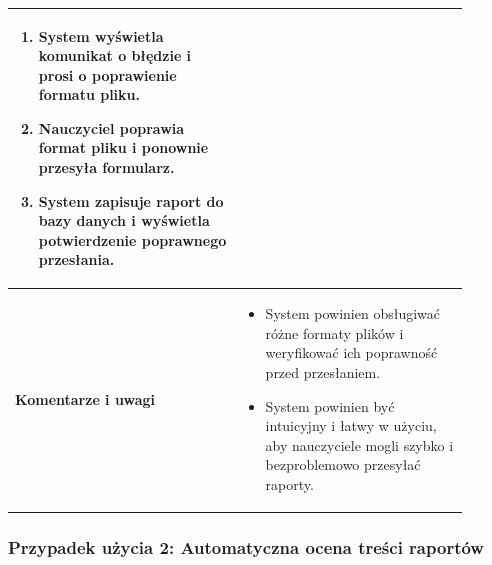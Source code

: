 \documentclass[a4paper, 12pt]{article}
\begin{document}
\begin{table}[H]
\begin{tabular}{|p{0.45\linewidth}|p{0.45\linewidth}|}
\begin{enumerate}
    \item System wyświetla komunikat o błędzie i prosi o poprawienie formatu pliku.
    \item Nauczyciel poprawia format pliku i ponownie przesyła formularz.
    \item System zapisuje raport do bazy danych i wyświetla potwierdzenie poprawnego przesłania.
\end{enumerate} \\
\hline
\textbf{Komentarze i uwagi} &
\begin{itemize}
    \item System powinien obsługiwać różne formaty plików i weryfikować ich poprawność przed przesłaniem.
    \item System powinien być intuicyjny i łatwy w użyciu, aby nauczyciele mogli szybko i bezproblemowo przesyłać raporty.
\end{itemize} \\
\hline
\end{tabular}
\end{table}

\subsubsection{Przypadek użycia 2: Automatyczna ocena treści raportów}
\end{document}
